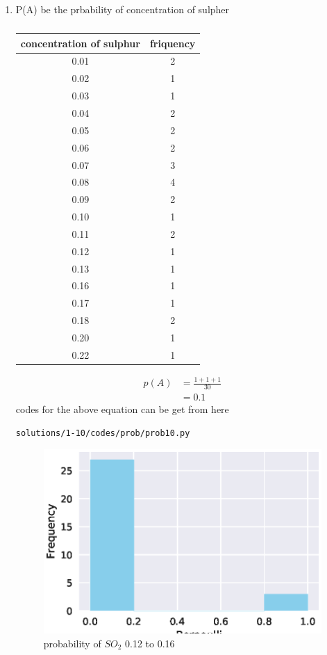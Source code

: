 \begin{enumerate}
\item P(A) be the prbability of concentration of sulpher

\begin{table}[!ht]
\begin{tabular}{ |c|c| } 
	\hline
	\textbf{concentration of sulphur} &\textbf{friquency}\\
	\hline
	0.01 &2\\ 
	0.02 &1\\ 
	0.03 &1\\ 
	0.04 &2\\ 
	0.05 &2\\ 
	0.06 &2\\ 
	0.07 &3\\
	0.08 &4\\ 
	0.09 &2\\ 
	0.10 &1\\ 
	0.11 &2\\ 
	0.12 &1\\ 
	0.13 &1\\ 
	0.16 &1\\ 
	0.17 &1\\ 
	0.18 &2\\ 
	0.20 &1\\ 
	0.22 &1\\   
	\hline
\end{tabular}	
	\caption{}
	\label{tab:template}
\end{table}
\begin{align}
p\left(A\right) &= \frac{1+1+1}{30}
\\
&= 0.1
\end{align}
codes for the above equation can be get from here
\begin{lstlisting}
solutions/1-10/codes/prob/prob10.py
\end{lstlisting}
\begin{figure}[!ht]
	\centering
	\includegraphics[width=\columnwidth]{./solutions/1-10/figures/prob/prob10.eps}
	\caption{probability of $SO_2$ 0.12 to 0.16 }
	\label{fig:bt9}
\end{figure}
\end{enumerate}
